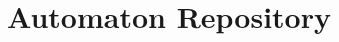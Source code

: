 \documentclass[a4paper]{report}
\newenvironment{shell}
{\begin{alltt}}
{\end{alltt}}
\newcommand\kbd[1]{\textsl{\texttt{#1}}}
\newcommand\file[1]{`\texttt{#1}'}
\newcommand\command[1]{\texttt{#1}}
\newcommand\var[1]{{\ttfamily\itshape #1}}
\newcommand\code[1]{\texttt{#1}}
\newcommand\samp[1]{`\texttt{#1}'}
\newcommand{\taffn}[1]{\code{#1}}
\begin{document}
%
%
%
%
%
%
%




\chapter{Automaton Repository}\label{chap:autrepository}
\end{document}
